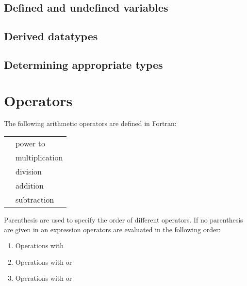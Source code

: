 \subsection{Defined and undefined variables}

\subsection{Derived datatypes}

\subsection{Determining appropriate types}

\section{Operators}

The following arithmetic operators are defined in Fortran:

\vspace{5mm}
\begin{tabular}{ll}
  \foper{**} & power to \\
  \foper{*} & multiplication \\
  \foper{/} & division \\
  \foper{+} & addition \\
  \foper{-} & subtraction \\
\end{tabular}
\vspace{5mm}

Parenthesis are used to specify the order of different operators. If no parenthesis are given in an expression operators are evaluated in the following order:

\begin{enumerate}
\item Operations with \foper{**}%
\item Operations with \foper{*} or \foper{/}%
\item Operations with \foper{+} or \foper{--}
\end{enumerate}

